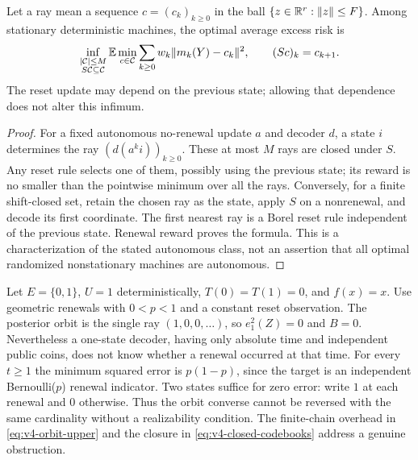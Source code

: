 \begin{proposition}\label{prop:v4-closure}
Let a ray mean a sequence $c=(c_k)_{k\ge0}$ in the ball
$\{z\in\mathbb R^r:\|z\|\le F\}$. Among stationary deterministic machines,
the optimal average excess risk is
\begin{equation}
 \inf_{\substack{|\mathcal C|\le M\\ S\mathcal C\subseteq\mathcal C}}
       \mathbb E\min_{c\in\mathcal C}\sum_{k\ge0}w_k\|m_k(Y)-c_k\|^2,
 \qquad (Sc)_k=c_{k+1}.                                        \label{eq:v4-closed-codebooks}
\end{equation}
The reset update may depend on the previous state; allowing that
dependence does not alter this infimum.
\end{proposition}
\begin{proof}
For a fixed autonomous no-renewal update $a$ and decoder $d$, a state
$i$ determines the ray $(d(a^ki))_{k\ge0}$. These at most $M$ rays
are closed under $S$. Any reset rule selects one of them, possibly
using the previous state; its reward is no smaller than the pointwise
minimum over all the rays. Conversely, for a finite shift-closed set,
retain the chosen ray as the state, apply $S$ on a nonrenewal, and
decode its first coordinate. The first nearest ray is a Borel reset
rule independent of the previous state. Renewal reward proves the
formula. This is a characterization of the stated autonomous class,
not an assertion that all optimal randomized nonstationary machines
are autonomous.
\end{proof}

\begin{example}\label{ex:v4-gap}
Let $E=\{0,1\}$, $U=1$ deterministically, $T(0)=T(1)=0$, and
$f(x)=x$. Use geometric renewals with $0<p<1$ and a constant reset
observation. The posterior orbit is the single ray $(1,0,0,\ldots)$,
so $e_1^2(Z)=0$ and $B=0$. Nevertheless a one-state decoder, having
only absolute time and independent public coins, does not know
whether a renewal occurred at that time. For every $t\ge1$ the
minimum squared error is $p(1-p)$, since the target is an independent
Bernoulli($p$) renewal indicator. Two states suffice for zero error:
write $1$ at each renewal and $0$ otherwise. Thus the orbit converse
cannot be reversed with the same cardinality without a realizability
condition. The finite-chain overhead in \eqref{eq:v4-orbit-upper}
and the closure in \eqref{eq:v4-closed-codebooks} address a genuine
obstruction.
\end{example}
